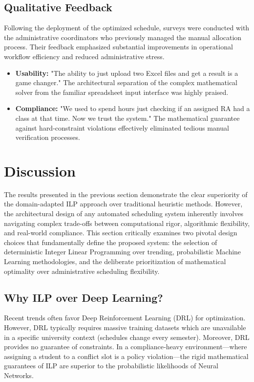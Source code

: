 \documentclass[journal,onecolumn]{IEEEtran}
\begin{document}
\subsection{Qualitative Feedback}
Following the deployment of the optimized schedule, surveys were conducted with the administrative coordinators who previously managed the manual allocation process. Their feedback emphasized substantial improvements in operational workflow efficiency and reduced administrative stress.
\begin{itemize}
    \item \textbf{Usability:} "The ability to just upload two Excel files and get a result is a game changer." The architectural separation of the complex mathematical solver from the familiar spreadsheet input interface was highly praised.
    \item \textbf{Compliance:} "We used to spend hours just checking if an assigned RA had a class at that time. Now we trust the system." The mathematical guarantee against hard-constraint violations effectively eliminated tedious manual verification processes.
\end{itemize}

\section{Discussion}

The results presented in the previous section demonstrate the clear superiority of the domain-adapted ILP approach over traditional heuristic methods. However, the architectural design of any automated scheduling system inherently involves navigating complex trade-offs between computational rigor, algorithmic flexibility, and real-world compliance. This section critically examines two pivotal design choices that fundamentally define the proposed system: the selection of deterministic Integer Linear Programming over trending, probabilistic Machine Learning methodologies, and the deliberate prioritization of mathematical optimality over administrative scheduling flexibility.

\subsection{Why ILP over Deep Learning?}
Recent trends often favor Deep Reinforcement Learning (DRL) for optimization. However, DRL typically requires massive training datasets which are unavailable in a specific university context (schedules change every semester). Moreover, DRL provides no guarantee of constraints. In a compliance‑heavy environment—where assigning a student to a conflict slot is a policy violation—the rigid mathematical guarantees of ILP are superior to the probabilistic likelihoods of Neural Networks.
\end{document}
